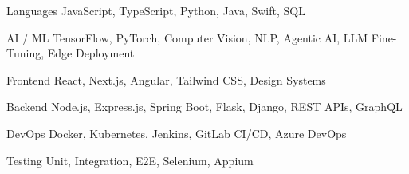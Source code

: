 
\begin{cvskills}

  \cvskill
    {Languages}
    {JavaScript, TypeScript, Python, Java, Swift, SQL}

  \cvskill
    {AI / ML}
    {TensorFlow, PyTorch, Computer Vision, NLP, Agentic AI, LLM Fine-Tuning, Edge Deployment}

  \cvskill
    {Frontend}
    {React, Next.js, Angular, Tailwind CSS, Design Systems}

  \cvskill
    {Backend}
    {Node.js, Express.js, Spring Boot, Flask, Django, REST APIs, GraphQL}

  \cvskill
    {DevOps}
    {Docker, Kubernetes, Jenkins, GitLab CI/CD, Azure DevOps}

  \cvskill
    {Testing}
    {Unit, Integration, E2E, Selenium, Appium}

\end{cvskills}
